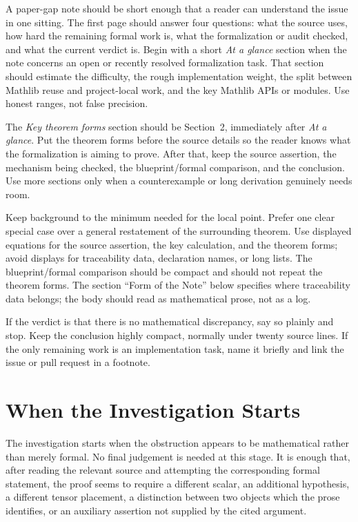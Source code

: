 \documentclass[11pt]{article}
\begin{document}
A paper-gap note should be short enough that a reader can understand the issue
in one sitting.  The first page should answer four questions: what the source
uses, how hard the remaining formal work is, what the formalization or audit
checked, and what the current verdict is.  Begin with a short
\emph{At a glance} section when the note concerns an open or recently resolved
formalization task.  That section should estimate the difficulty, the rough
implementation weight, the split between Mathlib reuse and project-local work,
and the key Mathlib APIs or modules.  Use honest ranges, not false precision.

The \emph{Key theorem forms} section should be Section~2, immediately after
\emph{At a glance}.  Put the theorem forms before the source details so the
reader knows what the formalization is aiming to prove.  After that, keep the
source assertion, the mechanism being checked, the blueprint/formal comparison,
and the conclusion.  Use more sections only when a counterexample or long
derivation genuinely needs room.

Keep background to the minimum needed for the local point.  Prefer one clear
special case over a general restatement of the surrounding theorem.  Use displayed
equations for the source assertion, the key calculation, and the theorem forms;
avoid displays for traceability data, declaration names, or long lists.  The
blueprint/formal comparison should be compact and should not repeat the theorem
forms.  The section ``Form of the Note'' below specifies where traceability data
belongs; the body should read as mathematical prose, not as a log.

If the verdict is that there is no mathematical discrepancy, say so plainly and
stop.  Keep the conclusion highly compact, normally under twenty source lines.
If the only remaining work is an implementation task, name it briefly and link
the issue or pull request in a footnote.

\section{When the Investigation Starts}

The investigation starts when the obstruction appears to be mathematical rather
than merely formal.  No final judgement is needed at this stage.  It is enough
that, after reading the relevant source and attempting the corresponding formal
statement, the proof seems to require a different scalar, an additional
hypothesis, a different tensor placement, a distinction between two objects which
the prose identifies, or an auxiliary assertion not supplied by the cited
argument.
\end{document}
